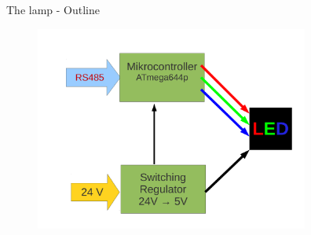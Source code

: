 \documentclass{beamer}
\begin{document}
  \begin{frame}{The lamp - Outline}
    \begin{figure}
    \begin{center}
    \includegraphics[width=9cm]{bilder/led_12v_rs485.pdf}
    \end{center}
    \end{figure}
  \end{frame}
\end{document}
